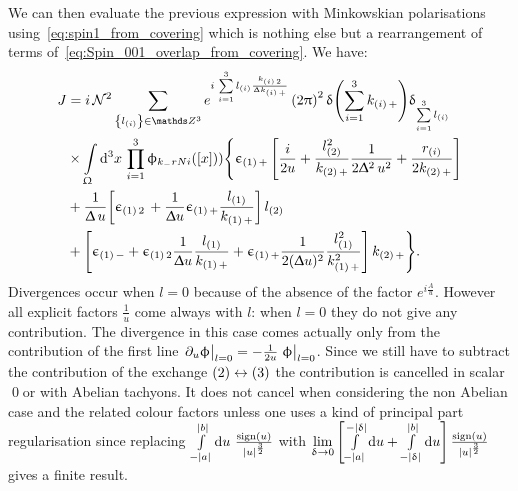 We can then evaluate the previous expression with Minkowskian polarisations using~\eqref{eq:spin1_from_covering} which is nothing else but a rearrangement of terms of~\eqref{eq:Spin_001_overlap_from_covering}.
We have:
\begin{equation}
  \begin{split}
    J
    & =
    i\, \cN^2
    \sum_{ \qty{ l_{\qty(i)} } \in \Z^3 }
    e^{%
      i\, \finitesum{i}{1}{3} l_{\qty(i)} \frac{k_{\qty(i)\, 2}}{\Delta k_{\qty(i)\, +}}
    }\,
    \qty(2\pi)^2\,
    \delta\qty( \finitesum{i}{1}{3} k_{\qty(i)\, +} )
    \delta_{\finitesum{i}{1}{3} l_{\qty(i)}}
    \\
    & \times
    \int\limits_{\Omega} \dd[3]{x}\,
    \finiteprod{i}{1}{3}
    \phi_{k_-rN{i}}\qty(\qty[x]))
    \Biggl\lbrace
      \epsilon_{\qty(1)\, +}\,
      \qty[
        \frac{i}{2 u}
        +
        \frac{l_{\qty(2)}^2}{k_{\qty(2)\, +}} \frac{1}{2 \Delta^2\, u^2}
        +
        \frac{r_{\qty(i)}}{2 k_{\qty(2)\, +}}
      ]
      \\
      & +
      \frac{1}{\Delta\, u}
      \qty[%
        \epsilon_{\qty(1)\, 2}\,
        +
        \frac{1}{\Delta u} \epsilon_{\qty(1)\, +} \frac{l_{\qty(1)}}{k_{\qty(1)\, +}}
      ]\,
      l_{\qty(2)}
      \\
      & +
      \qty[%
        \epsilon_{\qty(1)\, -}
        +
        \epsilon_{\qty(1)\, 2} \frac{1}{\Delta u} \frac{l_{\qty(1)}}{k_{\qty(1)\, +}}
        +
        \epsilon_{\qty(1)\, +} \frac{1}{2 (\Delta u)^2} \frac{l_{\qty(1)}^2}{k_{\qty(1)\, +}^2}
      ]\,
      k_{\qty(2)\, +}
    \Biggr\rbrace.
  \end{split}
  \label{eq:divergence_overlap_spin1}
\end{equation}
Divergences occur when $l = 0$ because of the absence of the factor $e^{i \frac{A}{u}}$.
However all explicit factors $\frac{1}{u}$ come always with $l$: when $l = 0$ they do not give any contribution.
The divergence in this case comes actually only from the contribution of the first line $\eval{\ipd{u}\phi}_{l = 0} = -\frac{1}{2u} \eval{\phi}_{l = 0}$.
Since we still have to subtract the contribution of the exchange $\qty(2) \leftrightarrow \qty(3)$ the contribution is cancelled in scalar \qed or with Abelian tachyons.
It does not cancel when considering the non Abelian case and the related colour factors unless one uses a kind of principal part regularisation since replacing $\finiteint{u}{-\abs{a}}{\abs{b}}\, \frac{\sgn(u)}{\abs{u}^{\frac{3}{2}}}$ with $\lim\limits_{\delta \rightarrow 0} \qty[\finiteint{u}{-\abs{a}}{-\abs{\delta}} + \finiteint{u}{-\abs{\delta}}{\abs{b}}]\, \frac{\sgn(u)}{\abs{u}^{\frac{3}{2}}}$ gives a finite result.


